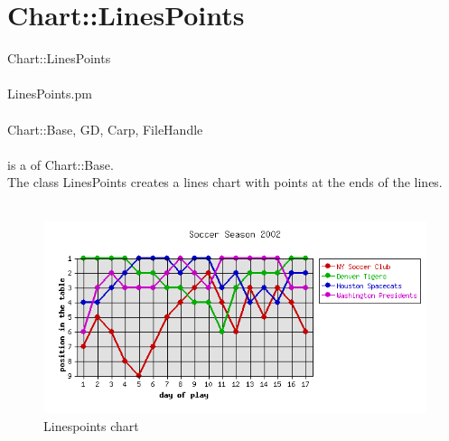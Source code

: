\section{Chart::LinesPoints}
 Chart::LinesPoints\\ \\
 LinesPoints.pm\\ \\
Chart::Base, GD, Carp, FileHandle\\ \\
  is a  of Chart::Base.\\
The class LinesPoints creates a lines chart with points at the ends of the lines.\\
\\
\begin{figure}[h]
	\begin{center}
		\includegraphics[scale=0.6]{d_linesp2.png}
	\end{center}
	\caption{Linespoints chart}
	\label{fig:d_linesp2}
\end{figure}
